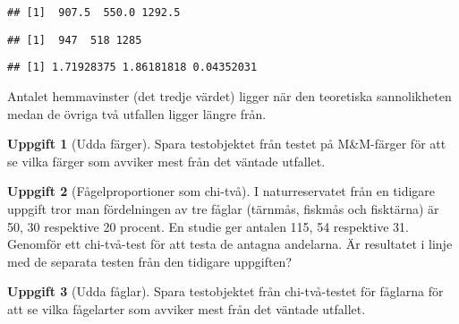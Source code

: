 \documentclass[
]{book}
\newenvironment{Shaded}{\begin{snugshade}}{\end{snugshade}}
\newcommand{\DecValTok}[1]{\textcolor[rgb]{0.00,0.00,0.81}{#1}}
\newcommand{\NormalTok}[1]{#1}
\newcommand{\SpecialCharTok}[1]{\textcolor[rgb]{0.00,0.00,0.00}{#1}}
\theoremstyle{definition}
\theoremstyle{definition}
\theoremstyle{definition}
\newtheorem{exercise}{Uppgift}[chapter]
\theoremstyle{definition}
\theoremstyle{remark}
\begin{document}
\begin{verbatim}
## [1]  907.5  550.0 1292.5
\end{verbatim}

\begin{Shaded}
\end{Shaded}

\begin{verbatim}
## [1]  947  518 1285
\end{verbatim}

\begin{Shaded}
\end{Shaded}

\begin{verbatim}
## [1] 1.71928375 1.86181818 0.04352031
\end{verbatim}

Antalet hemmavinster (det tredje värdet) ligger när den teoretiska sannolikheten medan de övriga två utfallen ligger längre från.

\begin{exercise}[Udda färger]
Spara testobjektet från testet på M\&M-färger för att se vilka färger som avviker mest från det väntade utfallet.
\end{exercise}

\begin{exercise}[Fågelproportioner som chi-två]
I naturreservatet från en tidigare uppgift tror man fördelningen av tre fåglar (tärnmås, fiskmås och fisktärna) är 50, 30 respektive 20 procent. En studie ger antalen 115, 54 respektive 31. Genomför ett chi-två-test för att testa de antagna andelarna. Är resultatet i linje med de separata testen från den tidigare uppgiften?
\end{exercise}

\begin{exercise}[Udda fåglar]
Spara testobjektet från chi-två-testet för fåglarna för att se vilka fågelarter som avviker mest från det väntade utfallet.
\end{exercise}
\end{document}
